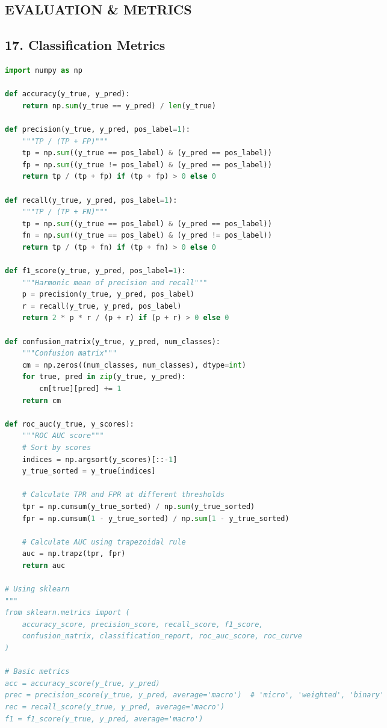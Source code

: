 \documentclass[8pt,landscape]{article}
\begin{document}
\begin{multicols}{3}
\section*{EVALUATION \& METRICS}

\subsection*{17. Classification Metrics}
\begin{lstlisting}[language=Python]
import numpy as np

def accuracy(y_true, y_pred):
    return np.sum(y_true == y_pred) / len(y_true)

def precision(y_true, y_pred, pos_label=1):
    """TP / (TP + FP)"""
    tp = np.sum((y_true == pos_label) & (y_pred == pos_label))
    fp = np.sum((y_true != pos_label) & (y_pred == pos_label))
    return tp / (tp + fp) if (tp + fp) > 0 else 0

def recall(y_true, y_pred, pos_label=1):
    """TP / (TP + FN)"""
    tp = np.sum((y_true == pos_label) & (y_pred == pos_label))
    fn = np.sum((y_true == pos_label) & (y_pred != pos_label))
    return tp / (tp + fn) if (tp + fn) > 0 else 0

def f1_score(y_true, y_pred, pos_label=1):
    """Harmonic mean of precision and recall"""
    p = precision(y_true, y_pred, pos_label)
    r = recall(y_true, y_pred, pos_label)
    return 2 * p * r / (p + r) if (p + r) > 0 else 0

def confusion_matrix(y_true, y_pred, num_classes):
    """Confusion matrix"""
    cm = np.zeros((num_classes, num_classes), dtype=int)
    for true, pred in zip(y_true, y_pred):
        cm[true][pred] += 1
    return cm

def roc_auc(y_true, y_scores):
    """ROC AUC score"""
    # Sort by scores
    indices = np.argsort(y_scores)[::-1]
    y_true_sorted = y_true[indices]

    # Calculate TPR and FPR at different thresholds
    tpr = np.cumsum(y_true_sorted) / np.sum(y_true_sorted)
    fpr = np.cumsum(1 - y_true_sorted) / np.sum(1 - y_true_sorted)

    # Calculate AUC using trapezoidal rule
    auc = np.trapz(tpr, fpr)
    return auc

# Using sklearn
"""
from sklearn.metrics import (
    accuracy_score, precision_score, recall_score, f1_score,
    confusion_matrix, classification_report, roc_auc_score, roc_curve
)

# Basic metrics
acc = accuracy_score(y_true, y_pred)
prec = precision_score(y_true, y_pred, average='macro')  # 'micro', 'weighted', 'binary'
rec = recall_score(y_true, y_pred, average='macro')
f1 = f1_score(y_true, y_pred, average='macro')


\end{lstlisting}
\end{multicols}
\end{document}
